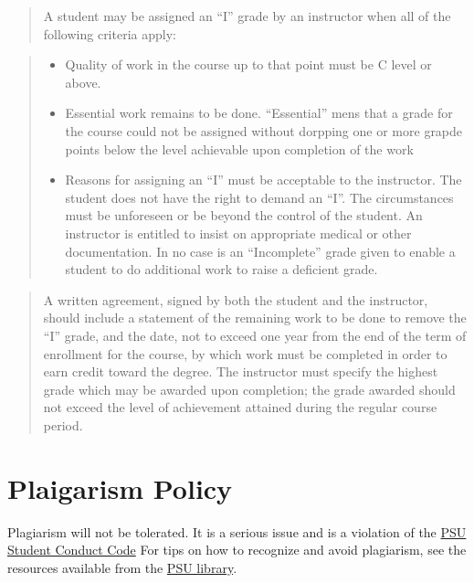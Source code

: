 \documentclass[11pt,]{article}
\providecommand{\tightlist}{%
  \setlength{\itemsep}{0pt}\setlength{\parskip}{0pt}}
\begin{document}
\begin{quote}
A student may be assigned an ``I'' grade by an instructor when all of
the following criteria apply:
\end{quote}

\begin{quote}
\begin{itemize}
\tightlist
\item
  Quality of work in the course up to that point must be C level or
  above.
\item
  Essential work remains to be done. ``Essential'' mens that a grade for
  the course could not be assigned without dorpping one or more grapde
  points below the level achievable upon completion of the work
\item
  Reasons for assigning an ``I'' must be acceptable to the instructor.
  The student does not have the right to demand an ``I''. The
  circumstances must be unforeseen or be beyond the control of the
  student. An instructor is entitled to insist on appropriate medical or
  other documentation. In no case is an ``Incomplete'' grade given to
  enable a student to do additional work to raise a deficient grade.
\end{itemize}
\end{quote}

\begin{quote}
A written agreement, signed by both the student and the instructor,
should include a statement of the remaining work to be done to remove
the ``I'' grade, and the date, not to exceed one year from the end of
the term of enrollment for the course, by which work must be completed
in order to earn credit toward the degree. The instructor must specify
the highest grade which may be awarded upon completion; the grade
awarded should not exceed the level of achievement attained during the
regular course period.
\end{quote}

\section{Plaigarism Policy}\label{plaigarism-policy}

Plagiarism will not be tolerated. It is a serious issue and is a
violation of the
\href{https://www.pdx.edu/dos/psu-student-code-conduct}{PSU Student
Conduct Code} For tips on how to recognize and avoid plagiarism, see the
resources available from the
\href{https://library.pdx.edu/diy/avoid-plagiarism}{PSU library}.
\end{document}
